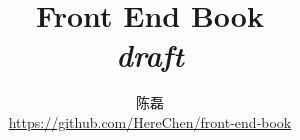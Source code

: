 \documentclass{book}
\begin{document}
\frontmatter
\title{Front End Book \\ \textit{draft}}
\author{陈磊 \\ \href{https://github.com/HereChen/front-end-book}{https://github.com/HereChen/front-end-book}}
\maketitle



\tableofcontents

\mainmatter


% 
% 
% 
% 


% 


% 
% 
% 

% 
% 

\end{document}
